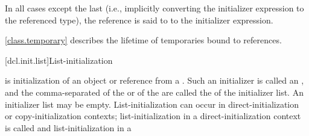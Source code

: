 In all cases except the last
(i.e., implicitly converting the initializer expression
to the referenced type),
the reference is said to  to the
initializer expression.

\pnum
\begin{note}
\ref{class.temporary} describes the lifetime of temporaries bound to references.
\end{note}

[dcl.init.list]{List-initialization}%

\pnum
{} is initialization of an object or reference from a
.
Such an initializer is called an , and
the comma-separated
of the 
or
of the 
are called the  of the initializer list. An initializer list may be empty.
List-initialization can occur in direct-initialization or copy-initialization contexts;
list-initialization in a direct-initialization context is called
 and list-initialization in a
